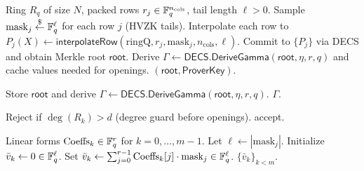 \begin{algorithm}[H]
\caption{\textsf{LVCS.CommitInitWithParams}(\(\mathrm{ringQ},\{r_j\}_{j<r},\ell,\mathrm{params}\)) \(\to (\mathsf{root},\mathsf{ProverKey})\) (prover)}
\label{alg:lvcs-commitinit}
\begin{algorithmic}[1]
\Require Ring \(R_q\) of size \(N\), packed rows \(r_j\in\mathbb{F}_q^{n_{\mathrm{cols}}}\), tail length \(\ell>0\).
\State Sample \(\mathrm{mask}_j\overset{\$}{\leftarrow} \mathbb{F}_q^{\ell}\) for each row \(j\) (HVZK tails).
\State Interpolate each row to \(P_j(X)\gets \textsf{interpolateRow}(\mathrm{ringQ},r_j,\mathrm{mask}_j,n_{\mathrm{cols}},\ell)\).
\State Commit to \(\{P_j\}\) via DECS and obtain Merkle root \(\mathsf{root}\).
\State Derive \(\Gamma\gets \textsf{DECS.DeriveGamma}(\mathsf{root},\eta,r,q)\) and cache values needed for openings.
\State \Return \((\mathsf{root},\mathsf{ProverKey})\).
\end{algorithmic}
\end{algorithm}

\begin{algorithm}[H]
\caption{\textsf{LVCS.CommitStep1}(\(\mathsf{root}\)) \(\to \Gamma\) (verifier)}
\label{alg:lvcs-commitstep1}
\begin{algorithmic}[1]
\State Store \(\mathsf{root}\) and derive \(\Gamma\gets \textsf{DECS.DeriveGamma}(\mathsf{root},\eta,r,q)\).
\State \Return \(\Gamma\).
\end{algorithmic}
\end{algorithm}

\begin{algorithm}[H]
\caption{\textsf{LVCS.CommitStep2}(\(\{R_k\}_{k<\eta}\)) \(\to\) accept/reject (verifier)}
\label{alg:lvcs-commitstep2}
\begin{algorithmic}[1]
  \State Reject if \(\deg(R_k) > d\) (degree guard before openings).
\EndFor
\State \Return accept.
\end{algorithmic}
\end{algorithm}

\begin{algorithm}[H]
\caption{\textsf{LVCS.EvalInitMany}(\(\mathrm{ringQ},\mathsf{ProverKey},\{\mathrm{Coeffs}_k\}_{k<m}\)) \(\to \{\bar v_k\}_{k<m}\) (prover)}
\label{alg:lvcs-evalinit}
\begin{algorithmic}[1]
\Require Linear forms \(\mathrm{Coeffs}_k\in\mathbb{F}_q^{r}\) for \(k=0,\dots,m-1\).
\State Let \(\ell\gets |\mathrm{mask}_j|\).
  \State Initialize \(\bar v_k\gets 0\in\mathbb{F}_q^{\ell}\).
  \State Set \(\bar v_k \gets \sum_{j=0}^{r-1} \mathrm{Coeffs}_k[j]\cdot \mathrm{mask}_j \in \mathbb{F}_q^{\ell}\).
\EndFor
\State \Return \(\{\bar v_k\}_{k<m}\).
\end{algorithmic}
\end{algorithm}

